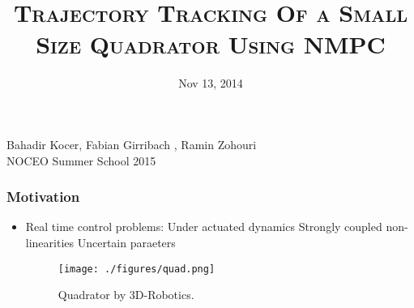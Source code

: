\documentclass[13pt	]{beamer}
\title{\large\textsc{Trajectory Tracking Of a Small Size Quadrator Using NMPC}}
\date{Nov 13, 2014}
\begin{document}
\begin{frame}
\titlepage
\begin{center}

\textsf{\footnotesize Bahadir Kocer, Fabian Girribach , Ramin Zohouri}\\
\textsf{\footnotesize NOCEO Summer School 2015}\\

\end{center}
\end{frame} 


\begin{frame}
\frametitle{Motivation}
\begin{itemize}
\item Real time control problems:
\subitem Under actuated dynamics
\subitem Strongly coupled non-linearities
\subitem Uncertain paraeters
\begin{figure}
\texttt{[image: ./figures/quad.png]}
\caption{\tiny Quadrator by 3D-Robotics.}
\end{figure}
\end{itemize}


\end{frame}
\end{document}
